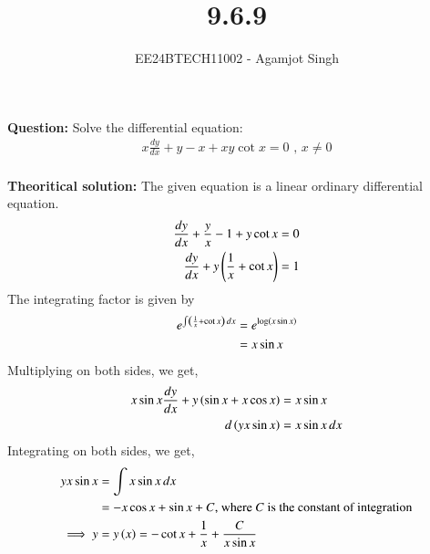 \documentclass[journal]{IEEEtran}
\begin{document}

\vspace{3cm}

\title{9.6.9}
\author{EE24BTECH11002 - Agamjot Singh}
{\let\newpage\relax\maketitle}

\renewcommand{\thefigure}{\theenumi}
\renewcommand{\thetable}{\theenumi}
\setlength{\intextsep}{10pt} %

\textbf{Question:}
\newline
Solve the differential equation:
\begin{align}
    x\frac{dy}{dx} + y - x + xy \cot{x} = 0 \text{ , } x\neq 0\\
\end{align}

\textbf{Theoritical solution:}
The given equation is a linear ordinary differential equation.
\begin{align}
    \frac{dy}{dx} + \frac{y}{x} - 1 + y \cot{x} = 0\\
    \frac{dy}{dx} + y \left(\frac{1}{x} + \cot{x}\right) = 1
\end{align}
The integrating factor is given by 
\begin{align}
    e^{\int \left(\frac{1}{x} + \cot{x}\right) \, dx} &= e^{\log \left(x \sin{x}\right)}\\
                                                &= x \sin {x}
\end{align}
Multiplying on both sides, we get,
\begin{align}
    x\sin{x}\frac{dy}{dx} + y\left(\sin{x} + x\cos{x}\right) &= x\sin{x}\\
    d\left(y x\sin{x}\right) &= x\sin{x} \, dx
\end{align}
Integrating on both sides, we get,
\begin{align}
    y x\sin{x} &= \int x\sin{x} \, dx\\
               &= -x\cos{x} + \sin{x} + C \text{, where } C \text{ is the constant of integration}\\
    \implies y &= y\left(x\right) = -\cot{x} + \frac{1}{x} + \frac{C}{x\sin{x}}
\end{align}
\end{document}
